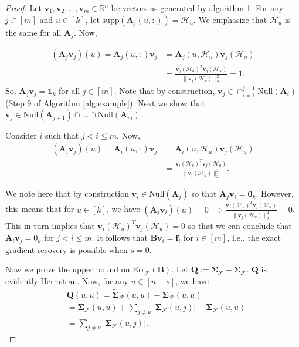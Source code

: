 \documentclass[journal,draftcls,onecolumn]{IEEEtran}
\theoremstyle{mystyle}
\newcommand{\bfQ}{\mathbf{Q}}
\newcommand{\bfA}{\mathbf{A}}
\newcommand{\bfB}{\mathbf{B}}
\newcommand{\bfv}{\mathbf{v}}
\begin{document}
\begin{proof}%
 Let $\mathbf{v}_1, \mathbf{v}_2, \dots, \mathbf{v}_m \in \mathbb{R}^n$ be vectors as generated by algorithm 1. For any $j \in [m]$ and $u\in [k]$, let $\text{supp}(\mathbf{A}_j(u, :)) = \mathcal{H}_u$. We emphasize that $\mathcal{H}_u$ is the same for all $\bfA_j$. Now, 

\begin{align*}(\mathbf{A}_j\mathbf{v}_j)(u) = \mathbf{A}_j(u,:)\mathbf{v}_j &= \mathbf{A}_j(u,\mathcal{H}_u)  \mathbf{v}_j({\mathcal{H}_u})\\
&= \frac{\mathbf{v}_j(\mathcal{H}_u)^T \mathbf{v}_j(\mathcal{H}_u)}{\|\mathbf{v}_j(\mathcal{H}_u)\|_2^2} = 1.
\end{align*}
So, $\mathbf{A}_j\mathbf{v}_j = \mathbf{1}_k$ for all $j \in [m]$. 
Note that by construction, $\bfv_j \in \cap_{i=1}^{j-1} \text{Null}(\bfA_i)$ (Step 9 of Algorithm \ref{alg:example}). Next we show that $\bfv_j \in \text{Null}(\bfA_{j+1}) \cap \dots \cap \text{Null}(\bfA_{m})$.

Consider $i$ such that $j < i \leq m$. Now,
\begin{align*}(\mathbf{A}_i\mathbf{v}_j)(u) = \mathbf{A}_i(u,:)\mathbf{v}_j &= \mathbf{A}_i(u,\mathcal{H}_u)  \mathbf{v}_j({\mathcal{H}_u})\\
&= \frac{\mathbf{v}_i(\mathcal{H}_u)^T \mathbf{v}_j(\mathcal{H}_u)}{\|\mathbf{v}_i(\mathcal{H}_u)\|_2^2}.
\end{align*}

We note here that by construction $\bfv_i \in \text{Null}(\bfA_j)$ so that  $\mathbf{A}_j\mathbf{v}_i = \mathbf{0}_k$. However, this means that for $u \in [k]$, we have $(\mathbf{A}_j\mathbf{v}_i)(u) = 0 \implies \frac{\mathbf{v}_j(\mathcal{H}_u)^T \mathbf{v}_i(\mathcal{H}_u)}{\|\mathbf{v}_j(\mathcal{H}_u)\|_2^2 } = 0$. This in turn implies that $\mathbf{v}_i(\mathcal{H}_u)^T \mathbf{v}_j(\mathcal{H}_u) = 0$ so that we can conclude that $\bfA_i \bfv_j = 0_k$ for $j < i \leq m$. It follows that $\bfB \bfv_i = \mathbf{f}_i$ for $i \in [m]$, i.e., the exact gradient recovery is possible when $s=0$.




Now we prove the upper bound on $\text{Err}_{\mathcal{F}}(\mathbf{B})$. Let $\mathbf{Q} := \tilde{\mathbf{\Sigma}}_{\mathcal{F}} - \mathbf{\Sigma}_{\mathcal{F}}$. $\bfQ$ is evidently Hermitian. Now, for any $u \in [n-s]$, we have
\begin{align*}
&\mathbf{Q}(u,u) = \tilde{\mathbf{\Sigma}}_{\mathcal{F}}(u,u) - \mathbf{\Sigma}_{\mathcal{F}}(u,u)\\ 
&= \mathbf{\Sigma}_{\mathcal{F}}(u,u) + \sum_{j \ne u} |\mathbf{\Sigma}_{\mathcal{F}}(u,j)| - \mathbf{\Sigma}_{\mathcal{F}}(u,u) \\
&=  \sum_{j \ne u} |\mathbf{\Sigma}_{\mathcal{F}}(u,j)|.
\end{align*}


\end{proof}
\end{document}
